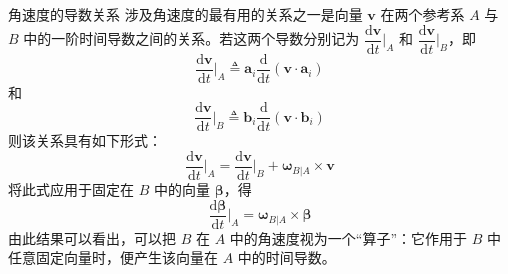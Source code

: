 \begin{myTheorem}{角速度的导数关系}
涉及角速度的最有用的关系之一是向量 $\bm{v}$ 在两个参考系 $A$ 与 $B$ 中的一阶时间导数之间的关系。若这两个导数分别记为 $\dfrac{\mathrm{d}\bm{v}}{\mathrm{d}t}\Big|_A$ 和 $\dfrac{\mathrm{d}\bm{v}}{\mathrm{d}t}\Big|_B$，即
\begin{equation}
    \frac{\mathrm{d}\bm{v}}{\mathrm{d}t}\Big|_A \triangleq \mathbf{a}_i\frac{\mathrm{d}}{\mathrm{d}t}(\bm{v}\cdot\mathbf{a}_i)
    \label{eq:角速度矢量:A系导数}
\end{equation}
和
\begin{equation}
    \frac{\mathrm{d}\bm{v}}{\mathrm{d}t}\Big|_B \triangleq \mathbf{b}_i\frac{\mathrm{d}}{\mathrm{d}t}(\bm{v}\cdot\mathbf{b}_i)
    \label{eq:角速度矢量:B系导数}
\end{equation}
则该关系具有如下形式：
\begin{equation}
    \frac{\mathrm{d}\bm{v}}{\mathrm{d}t}\Big|_A = \frac{\mathrm{d}\bm{v}}{\mathrm{d}t}\Big|_B + \bm{\omega}_{B|A}\times\bm{v}
    \label{eq:角速度矢量:导数关系}
\end{equation}
将此式应用于固定在 $B$ 中的向量 $\bm{\beta}$，得
\begin{equation}
    \frac{\mathrm{d}\bm{\beta}}{\mathrm{d}t}\Big|_A = \bm{\omega}_{B|A}\times\bm{\beta}
\end{equation}
由此结果可以看出，可以把 $B$ 在 $A$ 中的角速度视为一个“算子”：它作用于 $B$ 中任意固定向量时，便产生该向量在 $A$ 中的时间导数。
\end{myTheorem}

